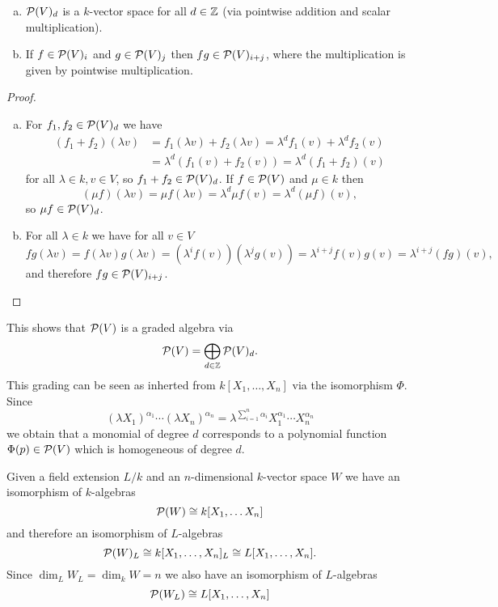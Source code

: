 \begin{lem}\leavevmode
 \begin{enumerate}[a)]
  \item
   $\mathcal{P}(V)_d$ is a $k$-vector space for all $d \in \mathbb{Z}$ (via pointwise addition and scalar multiplication).
  \item
   If $f \in \mathcal{P}(V)_i$ and $g \in \mathcal{P}(V)_j$  then $fg \in \mathcal{P}(V)_{i+j}$, where the multiplication is given by pointwise multiplication.
 \end{enumerate}
\end{lem}
\begin{proof}\leavevmode
 \begin{enumerate}[a)]
  \item For $f_1, f_2 \in \mathcal{P}(V)_d$ we have
  \begin{align*}
   (f_1+f_2)(\lambda v)
   &= f_1(\lambda v) + f_2(\lambda v)
   = \lambda^d f_1(v) + \lambda^d f_2(v) \\
   &= \lambda^d (f_1(v) + f_2(v))
   = \lambda^d (f_1 + f_2)(v)
  \end{align*}
  for all $\lambda \in k, v \in V$, so $f_1 + f_2 \in \mathcal{P}(V)_d$. If $f \in \mathcal{P}(V)$ and $\mu \in k$ then
  \[
   (\mu f)(\lambda v) = \mu f(\lambda v) = \lambda^d \mu f(v) = \lambda^d (\mu f)(v),
  \]
  so $\mu f \in \mathcal{P}(V)_d$.
  \item
  For all $\lambda \in k$ we have for all $v \in V$
  \[
   fg(\lambda v)
   = f(\lambda v) g(\lambda v)
   = \left(\lambda^i f(v)\right)\left(\lambda^j g(v)\right)
   = \lambda^{i+j} f(v) g(v)
   = \lambda^{i+j} (fg)(v),
  \]
  and therefore $fg \in \mathcal{P}(V)_{i+j}$. \qedhere
 \end{enumerate}
\end{proof}

This shows that $\mathcal{P}(V)$ is a graded algebra via
\[
  \mathcal{P}(V) = \bigoplus_{d \in \mathbb{Z}} \mathcal{P}(V)_d.
\]
This grading can be seen as inherted from $k[X_1, \dotsc, X_n]$ via the isomorphism $\Phi$. Since
\[
 (\lambda X_1)^{\alpha_1} \dotsm (\lambda X_n)^{\alpha_n}
 = \lambda^{\sum_{i=1}^n \alpha_i} X_1^{\alpha_1} \dotsm X_n^{\alpha_n}
\]
we obtain that a monomial of degree $d$ corresponds to a polynomial function $\Phi(p) \in \mathcal{P}(V)$ which is homogeneous of degree $d$.


Given a field extension $L/k$ and an $n$-dimensional $k$-vector space $W$ we have an isomorphism of $k$-algebras
\[
 \mathcal{P}(W) \cong k[X_1, \dotsc X_n]
\]
and therefore an isomorphism of $L$-algebras
\[
 \mathcal{P}(W)_L \cong k[X_1, \dotsc, X_n]_L \cong L[X_1, \dotsc, X_n].
\]
Since $\dim_L W_L = \dim_k W = n$ we also have an isomorphism of $L$-algebras
\[
 \mathcal{P}(W_L) \cong L[X_1, \dotsc, X_n]
\]


